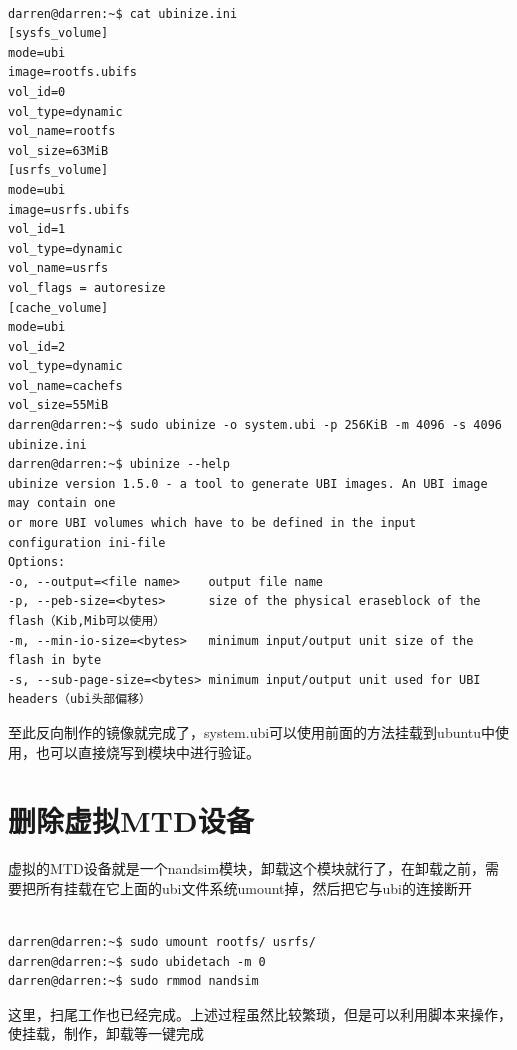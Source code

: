 \begin{mdframed}[backgroundcolor=ubuntured,fontcolor=white,hidealllines=true]
\begin{verbatim}

darren@darren:~$ cat ubinize.ini
[sysfs_volume]
mode=ubi
image=rootfs.ubifs
vol_id=0
vol_type=dynamic
vol_name=rootfs
vol_size=63MiB
[usrfs_volume]
mode=ubi
image=usrfs.ubifs
vol_id=1
vol_type=dynamic
vol_name=usrfs
vol_flags = autoresize
[cache_volume]
mode=ubi
vol_id=2
vol_type=dynamic
vol_name=cachefs
vol_size=55MiB
darren@darren:~$ sudo ubinize -o system.ubi -p 256KiB -m 4096 -s 4096 ubinize.ini
darren@darren:~$ ubinize --help
ubinize version 1.5.0 - a tool to generate UBI images. An UBI image may contain one 
or more UBI volumes which have to be defined in the input configuration ini-file
Options:
-o, --output=<file name>    output file name
-p, --peb-size=<bytes>      size of the physical eraseblock of the flash（Kib,Mib可以使用）
-m, --min-io-size=<bytes>   minimum input/output unit size of the flash in byte
-s, --sub-page-size=<bytes> minimum input/output unit used for UBI headers（ubi头部偏移）

\end{verbatim}
\end{mdframed}
至此反向制作的镜像就完成了，system.ubi可以使用前面的方法挂载到ubuntu中使用，也可以直接烧写到模块中进行验证。
\section{删除虚拟MTD设备}
虚拟的MTD设备就是一个nandsim模块，卸载这个模块就行了，在卸载之前，需要把所有挂载在它上面的ubi文件系统umount掉，然后把它与ubi的连接断开
\begin{mdframed}[backgroundcolor=ubuntured,fontcolor=white,hidealllines=true]
\begin{verbatim}

darren@darren:~$ sudo umount rootfs/ usrfs/
darren@darren:~$ sudo ubidetach -m 0
darren@darren:~$ sudo rmmod nandsim

\end{verbatim}
\end{mdframed}
这里，扫尾工作也已经完成。上述过程虽然比较繁琐，但是可以利用脚本来操作，使挂载，制作，卸载等一键完成
